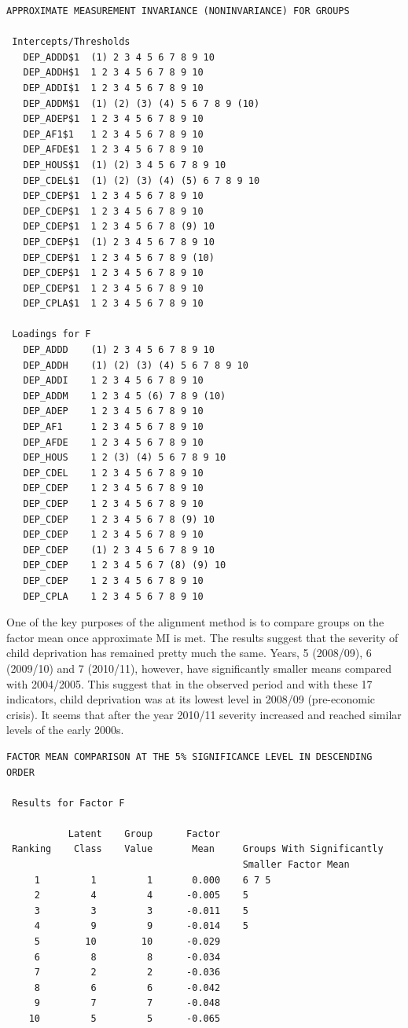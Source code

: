 \documentclass[]{book}
\begin{document}
\begin{verbatim}
APPROXIMATE MEASUREMENT INVARIANCE (NONINVARIANCE) FOR GROUPS

 Intercepts/Thresholds
   DEP_ADDD$1  (1) 2 3 4 5 6 7 8 9 10
   DEP_ADDH$1  1 2 3 4 5 6 7 8 9 10
   DEP_ADDI$1  1 2 3 4 5 6 7 8 9 10
   DEP_ADDM$1  (1) (2) (3) (4) 5 6 7 8 9 (10)
   DEP_ADEP$1  1 2 3 4 5 6 7 8 9 10
   DEP_AF1$1   1 2 3 4 5 6 7 8 9 10
   DEP_AFDE$1  1 2 3 4 5 6 7 8 9 10
   DEP_HOUS$1  (1) (2) 3 4 5 6 7 8 9 10
   DEP_CDEL$1  (1) (2) (3) (4) (5) 6 7 8 9 10
   DEP_CDEP$1  1 2 3 4 5 6 7 8 9 10
   DEP_CDEP$1  1 2 3 4 5 6 7 8 9 10
   DEP_CDEP$1  1 2 3 4 5 6 7 8 (9) 10
   DEP_CDEP$1  (1) 2 3 4 5 6 7 8 9 10
   DEP_CDEP$1  1 2 3 4 5 6 7 8 9 (10)
   DEP_CDEP$1  1 2 3 4 5 6 7 8 9 10
   DEP_CDEP$1  1 2 3 4 5 6 7 8 9 10
   DEP_CPLA$1  1 2 3 4 5 6 7 8 9 10

 Loadings for F
   DEP_ADDD    (1) 2 3 4 5 6 7 8 9 10
   DEP_ADDH    (1) (2) (3) (4) 5 6 7 8 9 10
   DEP_ADDI    1 2 3 4 5 6 7 8 9 10
   DEP_ADDM    1 2 3 4 5 (6) 7 8 9 (10)
   DEP_ADEP    1 2 3 4 5 6 7 8 9 10
   DEP_AF1     1 2 3 4 5 6 7 8 9 10
   DEP_AFDE    1 2 3 4 5 6 7 8 9 10
   DEP_HOUS    1 2 (3) (4) 5 6 7 8 9 10
   DEP_CDEL    1 2 3 4 5 6 7 8 9 10
   DEP_CDEP    1 2 3 4 5 6 7 8 9 10
   DEP_CDEP    1 2 3 4 5 6 7 8 9 10
   DEP_CDEP    1 2 3 4 5 6 7 8 (9) 10
   DEP_CDEP    1 2 3 4 5 6 7 8 9 10
   DEP_CDEP    (1) 2 3 4 5 6 7 8 9 10
   DEP_CDEP    1 2 3 4 5 6 7 (8) (9) 10
   DEP_CDEP    1 2 3 4 5 6 7 8 9 10
   DEP_CPLA    1 2 3 4 5 6 7 8 9 10
\end{verbatim}

One of the key purposes of the alignment method is to compare groups on the factor mean once approximate MI is met. The results suggest that the severity of child deprivation has remained pretty much the same. Years, 5 (2008/09), 6 (2009/10) and 7 (2010/11), however, have significantly smaller means compared with 2004/2005. This suggest that in the observed period and with these 17 indicators, child deprivation was at its lowest level in 2008/09 (pre-economic crisis). It seems that after the year 2010/11 severity increased and reached similar levels of the early 2000s.

\begin{verbatim}
FACTOR MEAN COMPARISON AT THE 5% SIGNIFICANCE LEVEL IN DESCENDING ORDER

 Results for Factor F

           Latent    Group      Factor
 Ranking    Class    Value       Mean     Groups With Significantly
                                          Smaller Factor Mean
     1         1         1       0.000    6 7 5
     2         4         4      -0.005    5
     3         3         3      -0.011    5
     4         9         9      -0.014    5
     5        10        10      -0.029
     6         8         8      -0.034
     7         2         2      -0.036
     8         6         6      -0.042
     9         7         7      -0.048
    10         5         5      -0.065
\end{verbatim}
\end{document}
